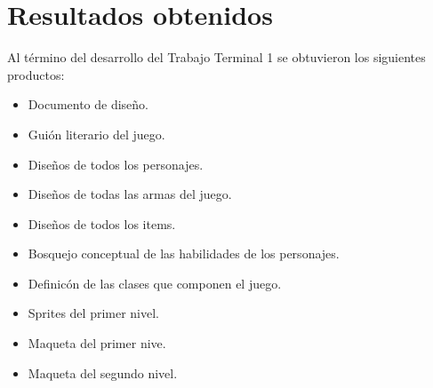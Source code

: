 \chapter{Resultados obtenidos}
Al término del desarrollo del Trabajo Terminal 1 se obtuvieron los siguientes 
productos:
	\begin{itemize}
		\item Documento de diseño.
		\item Guión literario del juego.
		\item Diseños de todos los personajes.
		\item Diseños de todas las armas del juego.
		\item Diseños de todos los items.
		\item Bosquejo conceptual de las habilidades de los personajes.
		\item Definicón de las clases que componen el juego.
		\item  Sprites del primer nivel.
		\item Maqueta del primer nive.
		\item Maqueta del segundo nivel. 
	\end{itemize}